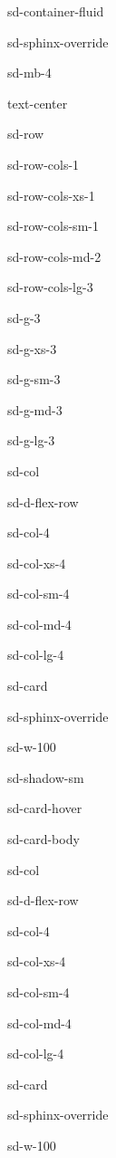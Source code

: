 \documentclass[letterpaper,10pt,english]{jupyterBook}
\begin{document}
\begin{sphinxuseclass}{sd-container-fluid}
\begin{sphinxuseclass}{sd-sphinx-override}
\begin{sphinxuseclass}{sd-mb-4}
\begin{sphinxuseclass}{text-center}
\begin{sphinxuseclass}{sd-row}
\begin{sphinxuseclass}{sd-row-cols-1}
\begin{sphinxuseclass}{sd-row-cols-xs-1}
\begin{sphinxuseclass}{sd-row-cols-sm-1}
\begin{sphinxuseclass}{sd-row-cols-md-2}
\begin{sphinxuseclass}{sd-row-cols-lg-3}
\begin{sphinxuseclass}{sd-g-3}
\begin{sphinxuseclass}{sd-g-xs-3}
\begin{sphinxuseclass}{sd-g-sm-3}
\begin{sphinxuseclass}{sd-g-md-3}
\begin{sphinxuseclass}{sd-g-lg-3}
\begin{sphinxuseclass}{sd-col}
\begin{sphinxuseclass}{sd-d-flex-row}
\begin{sphinxuseclass}{sd-col-4}
\begin{sphinxuseclass}{sd-col-xs-4}
\begin{sphinxuseclass}{sd-col-sm-4}
\begin{sphinxuseclass}{sd-col-md-4}
\begin{sphinxuseclass}{sd-col-lg-4}
\begin{sphinxuseclass}{sd-card}
\begin{sphinxuseclass}{sd-sphinx-override}
\begin{sphinxuseclass}{sd-w-100}
\begin{sphinxuseclass}{sd-shadow-sm}
\begin{sphinxuseclass}{sd-card-hover}
\begin{sphinxuseclass}{sd-card-body}
\begin{figure}[htbp]
\noindent{}
\end{figure}

\end{sphinxuseclass}{\hyperref[\detokenize{1_IVPs/1.0_IVPs::doc}]{}}
\end{sphinxuseclass}
\end{sphinxuseclass}
\end{sphinxuseclass}
\end{sphinxuseclass}
\end{sphinxuseclass}
\end{sphinxuseclass}
\end{sphinxuseclass}
\end{sphinxuseclass}
\end{sphinxuseclass}
\end{sphinxuseclass}
\end{sphinxuseclass}
\end{sphinxuseclass}
\begin{sphinxuseclass}{sd-col}
\begin{sphinxuseclass}{sd-d-flex-row}
\begin{sphinxuseclass}{sd-col-4}
\begin{sphinxuseclass}{sd-col-xs-4}
\begin{sphinxuseclass}{sd-col-sm-4}
\begin{sphinxuseclass}{sd-col-md-4}
\begin{sphinxuseclass}{sd-col-lg-4}
\begin{sphinxuseclass}{sd-card}
\begin{sphinxuseclass}{sd-sphinx-override}
\begin{sphinxuseclass}{sd-w-100}

\end{sphinxuseclass}
\end{sphinxuseclass}
\end{sphinxuseclass}
\end{sphinxuseclass}
\end{sphinxuseclass}
\end{sphinxuseclass}
\end{sphinxuseclass}
\end{sphinxuseclass}
\end{sphinxuseclass}
\end{sphinxuseclass}
\end{sphinxuseclass}
\end{sphinxuseclass}
\end{sphinxuseclass}
\end{sphinxuseclass}
\end{sphinxuseclass}
\end{sphinxuseclass}
\end{sphinxuseclass}
\end{sphinxuseclass}
\end{sphinxuseclass}
\end{sphinxuseclass}
\end{sphinxuseclass}
\end{sphinxuseclass}
\end{sphinxuseclass}
\end{sphinxuseclass}
\end{sphinxuseclass}
\end{document}
